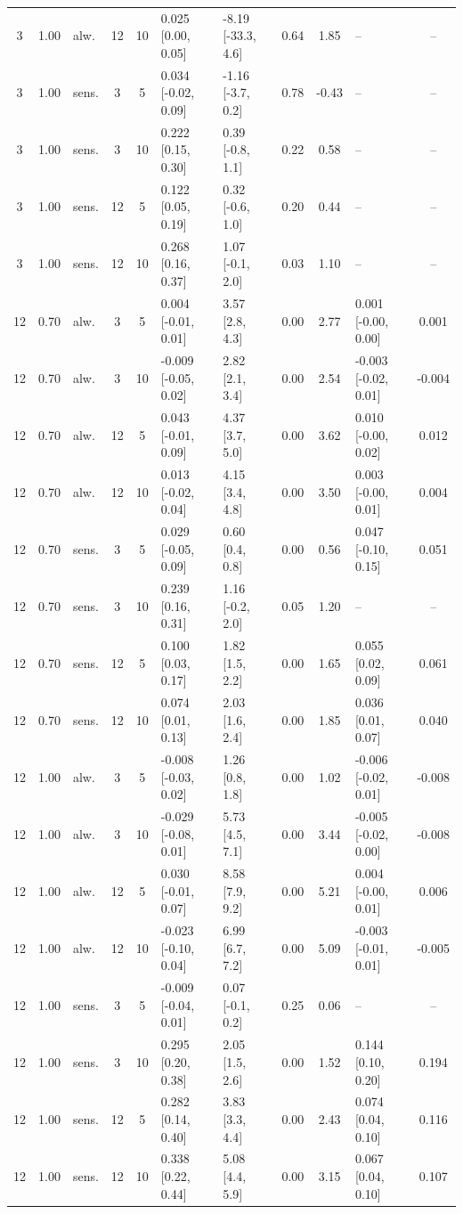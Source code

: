 \documentclass[10pt]{article}
\begin{document}
\begin{scriptsize}
\begin{longtable}{cclcc l l c c l c}
3 & 1.00 & alw. & 12 & 10 & 0.025 [0.00, 0.05] & -8.19 [-33.3, 4.6] & 0.64 & 1.85 & -- & -- \\
3 & 1.00 & sens. & 3 & 5 & 0.034 [-0.02, 0.09] & -1.16 [-3.7, 0.2] & 0.78 & -0.43 & -- & -- \\
3 & 1.00 & sens. & 3 & 10 & 0.222 [0.15, 0.30] & 0.39 [-0.8, 1.1] & 0.22 & 0.58 & -- & -- \\
3 & 1.00 & sens. & 12 & 5 & 0.122 [0.05, 0.19] & 0.32 [-0.6, 1.0] & 0.20 & 0.44 & -- & -- \\
3 & 1.00 & sens. & 12 & 10 & 0.268 [0.16, 0.37] & 1.07 [-0.1, 2.0] & 0.03 & 1.10 & -- & -- \\
12 & 0.70 & alw. & 3 & 5 & 0.004 [-0.01, 0.01] & 3.57 [2.8, 4.3] & 0.00 & 2.77 & 0.001 [-0.00, 0.00] & 0.001 \\
12 & 0.70 & alw. & 3 & 10 & -0.009 [-0.05, 0.02] & 2.82 [2.1, 3.4] & 0.00 & 2.54 & -0.003 [-0.02, 0.01] & -0.004 \\
12 & 0.70 & alw. & 12 & 5 & 0.043 [-0.01, 0.09] & 4.37 [3.7, 5.0] & 0.00 & 3.62 & 0.010 [-0.00, 0.02] & 0.012 \\
12 & 0.70 & alw. & 12 & 10 & 0.013 [-0.02, 0.04] & 4.15 [3.4, 4.8] & 0.00 & 3.50 & 0.003 [-0.00, 0.01] & 0.004 \\
12 & 0.70 & sens. & 3 & 5 & 0.029 [-0.05, 0.09] & 0.60 [0.4, 0.8] & 0.00 & 0.56 & 0.047 [-0.10, 0.15] & 0.051 \\
12 & 0.70 & sens. & 3 & 10 & 0.239 [0.16, 0.31] & 1.16 [-0.2, 2.0] & 0.05 & 1.20 & -- & -- \\
12 & 0.70 & sens. & 12 & 5 & 0.100 [0.03, 0.17] & 1.82 [1.5, 2.2] & 0.00 & 1.65 & 0.055 [0.02, 0.09] & 0.061 \\
12 & 0.70 & sens. & 12 & 10 & 0.074 [0.01, 0.13] & 2.03 [1.6, 2.4] & 0.00 & 1.85 & 0.036 [0.01, 0.07] & 0.040 \\
12 & 1.00 & alw. & 3 & 5 & -0.008 [-0.03, 0.02] & 1.26 [0.8, 1.8] & 0.00 & 1.02 & -0.006 [-0.02, 0.01] & -0.008 \\
12 & 1.00 & alw. & 3 & 10 & -0.029 [-0.08, 0.01] & 5.73 [4.5, 7.1] & 0.00 & 3.44 & -0.005 [-0.02, 0.00] & -0.008 \\
12 & 1.00 & alw. & 12 & 5 & 0.030 [-0.01, 0.07] & 8.58 [7.9, 9.2] & 0.00 & 5.21 & 0.004 [-0.00, 0.01] & 0.006 \\
12 & 1.00 & alw. & 12 & 10 & -0.023 [-0.10, 0.04] & 6.99 [6.7, 7.2] & 0.00 & 5.09 & -0.003 [-0.01, 0.01] & -0.005 \\
12 & 1.00 & sens. & 3 & 5 & -0.009 [-0.04, 0.01] & 0.07 [-0.1, 0.2] & 0.25 & 0.06 & -- & -- \\
12 & 1.00 & sens. & 3 & 10 & 0.295 [0.20, 0.38] & 2.05 [1.5, 2.6] & 0.00 & 1.52 & 0.144 [0.10, 0.20] & 0.194 \\
12 & 1.00 & sens. & 12 & 5 & 0.282 [0.14, 0.40] & 3.83 [3.3, 4.4] & 0.00 & 2.43 & 0.074 [0.04, 0.10] & 0.116 \\
12 & 1.00 & sens. & 12 & 10 & 0.338 [0.22, 0.44] & 5.08 [4.4, 5.9] & 0.00 & 3.15 & 0.067 [0.04, 0.10] & 0.107 \\
\end{longtable}
\end{scriptsize}
\end{document}
